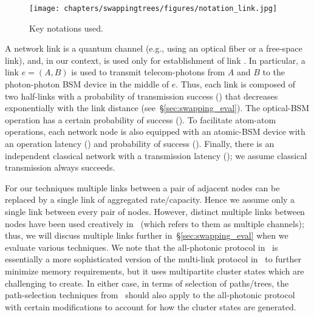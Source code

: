 \begin{figure}
    \centering
    \texttt{[image: chapters/swappingtrees/figures/notation\_link.jpg]}
  \vspace{0.3cm}
  \caption{Key notations used.}
  \label{fig:swapping_notation_link}
\end{figure}
A network link is a quantum channel (e.g., using an 
optical fiber or a free-space link),
and, in our context, is used only for establishment 
of link \eps.
In particular, a link $e=(A,B)$ is used to transmit telecom-photons 
from $A$ and $B$
to the photon-photon BSM device in the middle of $e$.
Thus, each link is composed of two 
half-links with a probability of transmission success (\ep) that decreases exponentially with the link distance (see~\S\ref{sec:swapping_eval}).
The optical-BSM operation has 
a certain probability of success (\php).
To facilitate atom-atom \es operations, each network node is also equipped 
with an atomic-BSM device 
with an operation latency (\bt) and probability of success (\bp). Finally, 
there is an independent classical network with a transmission latency (\ct);
we assume classical transmission  
always succeeds.

   For our techniques multiple links between a pair of  adjacent nodes can be replaced by a single link of aggregated
rate/capacity.  Hence we
assume only a single link between every pair of nodes. However, 
distinct multiple links between nodes have been used creatively
in~\cite{sigcomm20} (which refers to them as multiple channels); thus, we will 
discuss multiple links further in~\S\ref{sec:swapping_eval} when we evaluate various techniques. 
We note that the all-photonic protocol in~\cite{all-photo-15} is essentially a more sophisticated version of the multi-link \os protocol in~\cite{sigcomm20} to further
minimize memory requirements, but it uses multipartite cluster states which are
challenging to create. In either case, in terms of selection of paths/trees,
the path-selection techniques from~\cite{sigcomm20} should also apply to the all-photonic protocol with certain modifications to account for 
how the cluster states are generated.

